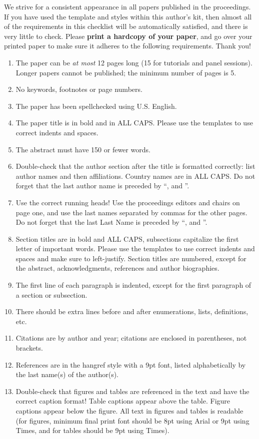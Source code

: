 \documentclass{wscpaperproc}
\theoremstyle{wsc}
\begin{document}
We strive for a consistent appearance in all papers published in the proceedings. If you have used the template and styles within this author's kit, then almost all of the requirements in this checklist will be automatically satisfied, and there is very little to check. Please {\bf print a hardcopy of your paper}, and go over your printed paper to make sure it adheres to the following requirements. Thank you!

\begin{enumerate}
\item The paper can be \textit{at most} 12 pages long (15 for tutorials and panel sessions). Longer papers cannot be published; the minimum number of pages is 5.
\item No keywords, footnotes or page numbers.
\item The paper has been spellchecked using U.S. English.
\item	The paper title is in bold and in ALL CAPS. Please use the templates to use correct indents and spaces.
\item The abstract must have 150 or fewer words.
\item	Double-check that the author section after the title is formatted correctly: list author names and then affiliations. Country names are in ALL CAPS. Do not forget that the last author name is preceded by ``, and ''.
\item	Use the correct running heads! Use the proceedings editors and chairs on page one, and use the last names separated by commas for the other pages. Do not forget that the last Last Name is preceded by ``, and ''.
\item Section titles are in bold and ALL CAPS, subsections capitalize the first letter of important words. Please use the templates to use correct indents and spaces and make sure to left-justify. Section titles are numbered, except for the abstract, acknowledgments, references and author biographies.
\item The first line of each paragraph is indented, except for the first paragraph of a section or subsection.
\item There should be extra lines before and after enumerations, lists, definitions, etc.
\item Citations are by author and year; citations are enclosed in parentheses, not brackets.
\item References are in the hangref style with a 9pt font, listed alphabetically by the last name(s) of the author(s).
\item Double-check that figures and tables are referenced in the text and have the correct caption format! Table captions appear above the table. Figure captions appear below the figure. All text in figures and tables is readable (for figures, minimum final print font should be 8pt using Arial or 9pt using Times, and for tables should be 9pt using Times).

\end{enumerate}
\end{document}
